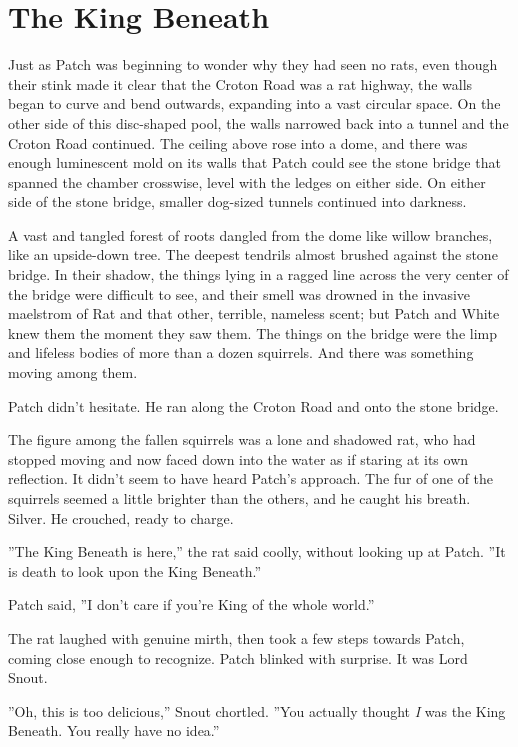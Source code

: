 \documentclass[12pt]{book}
\begin{document}
\section{The King Beneath}

 Just as Patch was beginning to wonder why they had seen no rats, even though their stink made it clear that the Croton Road was a rat highway, the walls began to curve and bend outwards, expanding into a vast circular space. On the other side of this disc-shaped pool, the walls narrowed back into a tunnel and the Croton Road continued. The ceiling above rose into a dome, and there was enough luminescent mold on its walls that Patch could see the stone bridge that spanned the chamber crosswise, level with the ledges on either side. On either side of the stone bridge, smaller dog-sized tunnels continued into darkness.\par
A vast and tangled forest of roots dangled from the dome like willow branches, like an upside-down tree. The deepest tendrils almost brushed against the stone bridge. In their shadow, the things lying in a ragged line across the very center of the bridge were difficult to see, and their smell was drowned in the invasive maelstrom of Rat and that other, terrible, nameless scent; but Patch and White knew them the moment they saw them. The things on the bridge were the limp and lifeless bodies of more than a dozen squirrels. And there was something moving among them.\par
 Patch didn't hesitate. He ran along the Croton Road and onto the stone bridge.\par
The figure among the fallen squirrels was a lone and shadowed rat, who had stopped moving and now faced down into the water as if staring at its own reflection. It didn't seem to have heard Patch's approach. The fur of one of the squirrels seemed a little brighter than the others, and he caught his breath. Silver. He crouched, ready to charge.\par
 ''The King Beneath is here,'' the rat said coolly, without looking up at Patch. ''It is death to look upon the King Beneath.''\par
 Patch said, ''I don't care if you're King of the whole world.''\par
 The rat laughed with genuine mirth, then took a few steps towards Patch, coming close enough to recognize. Patch blinked with surprise. It was Lord Snout.\par
''Oh, this is too delicious,'' Snout chortled. ''You actually thought {\it I} was the King Beneath. You really have no idea.''\par
\end{document}
